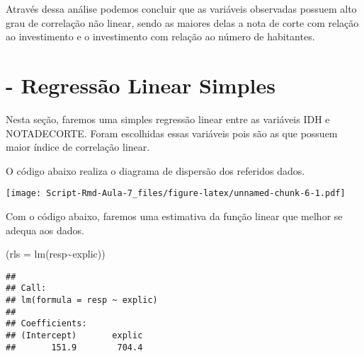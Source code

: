 \documentclass[
]{article}
\newenvironment{Shaded}{\begin{snugshade}}{\end{snugshade}}
\newcommand{\AttributeTok}[1]{\textcolor[rgb]{0.77,0.63,0.00}{#1}}
\newcommand{\CommentTok}[1]{\textcolor[rgb]{0.56,0.35,0.01}{\textit{#1}}}
\newcommand{\DecValTok}[1]{\textcolor[rgb]{0.00,0.00,0.81}{#1}}
\newcommand{\FunctionTok}[1]{\textcolor[rgb]{0.00,0.00,0.00}{#1}}
\newcommand{\NormalTok}[1]{#1}
\newcommand{\OtherTok}[1]{\textcolor[rgb]{0.56,0.35,0.01}{#1}}
\newcommand{\SpecialCharTok}[1]{\textcolor[rgb]{0.00,0.00,0.00}{#1}}
\newcommand{\StringTok}[1]{\textcolor[rgb]{0.31,0.60,0.02}{#1}}
\begin{document}
Através dessa análise podemos concluir que as variáveis observadas
possuem alto grau de correlação não linear, sendo as maiores delas a
nota de corte com relação ao investimento e o investimento com relação
ao número de habitantes.

\hypertarget{regressuxe3o-linear-simples}{%
\section{- Regressão Linear Simples}\label{regressuxe3o-linear-simples}}

Nesta seção, faremos uma simples regressão linear entre as variáveis IDH
e NOTADECORTE. Foram escolhidas essas variáveis pois são as que possuem
maior índice de correlação linear.

O código abaixo realiza o diagrama de dispersão dos referidos dados.

\begin{Shaded}
\end{Shaded}

\texttt{[image: Script-Rmd-Aula-7\_files/figure-latex/unnamed-chunk-6-1.pdf]}

Com o código abaixo, faremos uma estimativa da função linear que melhor
se adequa aos dados.

\begin{Shaded}
\begin{Highlighting}[]
\NormalTok{(}\AttributeTok{rls =} \FunctionTok{lm}\NormalTok{(resp}\SpecialCharTok{\textasciitilde{}}\NormalTok{explic))}
\end{Highlighting}
\end{Shaded}

\begin{verbatim}
## 
## Call:
## lm(formula = resp ~ explic)
## 
## Coefficients:
## (Intercept)       explic  
##       151.9        704.4
\end{verbatim}
\end{document}
